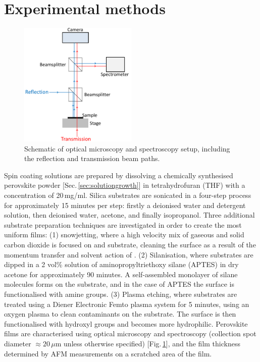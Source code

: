 \section{Experimental methods}
\label{sec:glass}
\begin{figure}[h!]
\centering    
\includegraphics[width=0.5\textwidth]{Microscope}
\caption{Schematic of optical microscopy and spectroscopy setup, including the reflection and transmission beam paths.}
\label{Microscope}
\end{figure}
Spin coating solutions are prepared by dissolving a chemically synthesised perovskite powder [Sec.\,\ref{sec:solutiongrowth}] in tetrahydrofuran (THF) with a concentration of 20\,mg/ml. Silica substrates are sonicated in a four-step process for approximately 15 minutes per step: firstly a deionised water and detergent solution, then deionised water, acetone, and finally isopropanol. Three additional substrate preparation techniques are investigated in order to create the most uniform films: (1)  snowjetting, where a high velocity mix of gaseous and solid carbon dioxide is focused on and substrate, cleaning the surface as a result of the momentum transfer and solvent action of  \cite{Snowjet}. (2) Silanisation, where substrates are dipped in a 2 vol\% solution of aminopropyltriethoxy silane (APTES) in dry acetone for approximately 90 minutes. A self-assembled monolayer of silane molecules forms on the substrate, and in the case of APTES the surface is functionalised with amine groups. (3) Plasma etching, where substrates are treated using a Diener Electronic Femto plasma system for 5 minutes, using an oxygen plasma to clean contaminants on the substrate. The surface is then functionalised with hydroxyl groups and becomes more hydrophilic. Perovskite films are characterised using optical microscopy and spectroscopy (collection spot diameter $\approx 20\,\mu$m unless otherwise specified) [Fig.\,\ref{Microscope}], and the film thickness determined by AFM measurements on a scratched area of the film.

